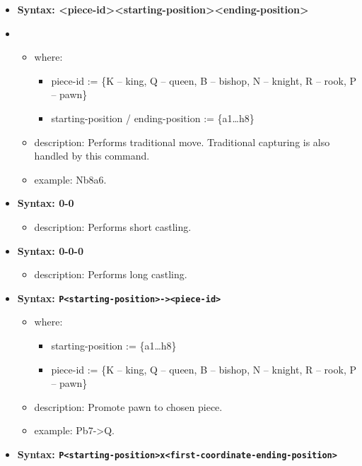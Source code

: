 \begin{itemize}
    \item \textbf{Syntax: <piece-id><starting-position><ending-position>}
    \item \begin{itemize}[label={}]
        \item where:
        \begin{itemize}[label={}] 
            \item piece-id := \{K -- king, Q -- queen, B -- bishop, N -- knight, R -- rook, P -- pawn\}
            \item starting-position / ending-position := \{a1\dots h8\}
        \end{itemize} 
        \item description: Performs traditional move. Traditional capturing is also handled by this command.
        \item example: Nb8a6.   
    \end{itemize}
    \item \textbf{Syntax: 0-0}
        \begin{itemize}[label={}]
            \item description: Performs short castling. 
        \end{itemize}
    \item \textbf{Syntax: 0-0-0}
        \begin{itemize}[label={}]
            \item description: Performs long castling. 
        \end{itemize}
    \item \textbf{Syntax: \texttt{P<starting-position>-><piece-id>}}
        \begin{itemize}[label={}]
            \item where:
            \begin{itemize}[label={}]
                \item starting-position := \{a1\dots h8\}
                \item piece-id := \{K -- king, Q -- queen, B -- bishop, N -- knight, R -- rook, P -- pawn\} 
            \end{itemize}
            \item description: Promote pawn to chosen piece.
            \item example: Pb7->Q. 
        \end{itemize}
    \item \textbf{Syntax: \texttt{P<starting-position>x<first-coordinate-ending-position>}}

\end{itemize}
